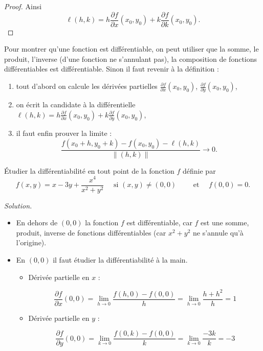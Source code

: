 \documentclass[12pt, class=report,crop=false]{standalone}
\begin{document}
{\begin{proof}
Ainsi 
$$\ell(h,k) = h \frac{\partial f}{\partial x}(x_0,y_0) +
k \frac{\partial f}{\partial k}(x_0,y_0).$$
\end{proof}




Pour montrer qu'une fonction est différentiable, on peut utiliser que la somme, le produit, l'inverse (d'une fonction ne s'annulant pas), la composition de fonctions différentiables est différentiable. Sinon il faut revenir à la définition : 
\begin{enumerate}
  \item tout d'abord on calcule les dérivées partielles 
  $\frac{\partial f}{\partial x}(x_0,y_0)$,  $\frac{\partial f}{\partial y}(x_0,y_0)$, 
  
  \item on écrit la candidate à la différentielle $
\ell(h,k) = 
h \frac{\partial f}{\partial x}(x_0,y_0) + 
k \frac{\partial f}{\partial y}(x_0,y_0)
$,

  \item il faut enfin prouver la limite :
$$\frac{f(x_0+ h,y_0+k) - f(x_0,y_0) - \ell(h,k)}{\|(h,k)\|} \longrightarrow  0.$$
  
\end{enumerate}




\begin{exemple}
\'Etudier la différentiabilité en tout point de la fonction $f$ définie par
$$f(x,y)= x-3y + \frac{x^4}{x^2+y^2}\quad\mbox{ si }(x,y)\neq (0,0)\qquad \text{ et }\quad f(0,0)=0.$$

 
\bigskip
\emph{Solution.}

\begin{itemize}
  \item En dehors de $(0,0)$ la fonction $f$ est différentiable, car $f$ est une somme, produit, inverse de fonctions différentiables (car $x^2+y^2$ ne s'annule qu'à l'origine).
  
  \item En $(0,0)$ il faut étudier la différentiabilité à la main.
  \begin{itemize}
    \item Dérivée partielle en $x$ :
      
  $$\frac{\partial f}{\partial x}(0,0) = \lim _{h\to 0}\frac{f(h,0)-f(0,0)}{h}=\lim _{h\to 0}\frac{h+h^2}{h}=1$$
  
    
    \item Dérivée partielle en $y$ :
      
  $$\frac{\partial f}{\partial y}(0,0) = \lim _{k\to 0}\frac{f(0,k)-f(0,0)}{k}=\lim_{k\to 0}\frac{-3k}{k}=-3$$
    

\end{itemize}
\end{itemize}
\end{exemple}}
\end{document}

